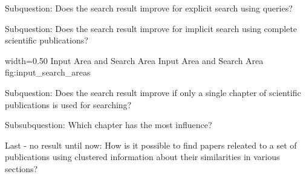 Subquestion: Does the search result improve for explicit search using queries?

Subquestion: Does the search result improve for implicit search using complete scientific publications?

      {width=0.50\textwidth}
      {Input Area and Search Area}
      {Input Area and Search Area}
      {fig:input_search_areas}

Subquestion: Does the search result improve if only a single chapter of scientific publications is used for searching?

Subsubquestion: Which chapter has the most influence?

Last - no result until now: How is it possible to find papers releated to a set of publications using clustered information about their similarities in various sections?
